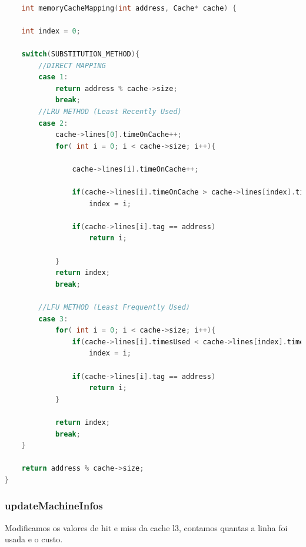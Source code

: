 \documentclass{article}
\begin{document}
\begin{lstlisting}[caption={Função memoryCacheMapping},label={lst:cod6},language=C]

    int memoryCacheMapping(int address, Cache* cache) {

    int index = 0;

    switch(SUBSTITUTION_METHOD){
        //DIRECT MAPPING
        case 1:
            return address % cache->size;
            break;
        //LRU METHOD (Least Recently Used)
        case 2:
            cache->lines[0].timeOnCache++;
            for( int i = 0; i < cache->size; i++){
                
                cache->lines[i].timeOnCache++;

                if(cache->lines[i].timeOnCache > cache->lines[index].timeOnCache)
                    index = i;
                
                if(cache->lines[i].tag == address)
                    return i;

            }
            return index;
            break;

        //LFU METHOD (Least Frequently Used)
        case 3:
            for( int i = 0; i < cache->size; i++){
                if(cache->lines[i].timesUsed < cache->lines[index].timesUsed)
                    index = i;

                if(cache->lines[i].tag == address)
                    return i;
            }

            return index;
            break;
    }

    return address % cache->size;
}

\end{lstlisting}

\subsubsection{updateMachineInfos}

Modificamos os valores de hit e miss da cache l3, contamos quantas a linha foi usada e o custo.
\end{document}
